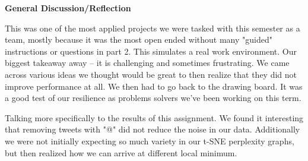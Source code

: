 \documentclass[12pt,article]{article}
\begin{document}
\begin{center} \Large{\textbf{General Discussion/Reflection}} \end{center}


This was one of the most applied projects we were tasked with this semester as a team, mostly because it was the most open ended without many "guided" instructions or questions in part 2.  This simulates a real work environment. Our biggest takeaway away -- it is challenging and sometimes frustrating.  We came across various ideas we thought would be great to then realize that they did not improve performance at all. We then had to go back to the drawing board.  It was a good test of our resilience as problems solvers we've been working on this term. \newline

Talking more specifically to the results of this assignment. We found it interesting that removing tweets with "@" did not reduce the noise in our data.  Additionally we were not initially expecting so much variety in our t-SNE perplexity graphs, but then realized how we can arrive at different local minimum.

%
\end{document}

